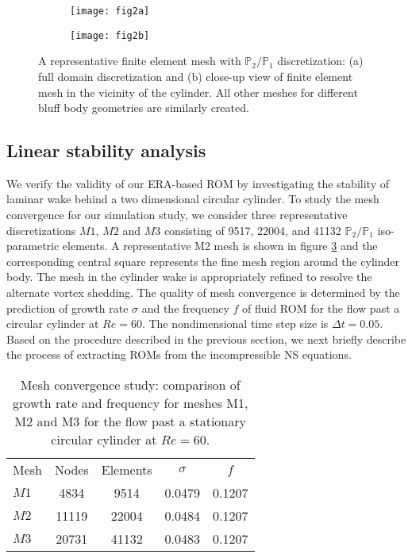 \documentclass{jfm}
\begin{document}
\begin{figure}
\centering
\begin{subfigure}{0.495\textwidth}
    \texttt{[image: fig2a]}
    \caption{}
    \label{fig:mesh_left}
    \end{subfigure} 
\begin{subfigure}{0.495\textwidth} 
\centering
 \texttt{[image: fig2b]}
	\caption{}
	\label{fig:mesh_right}
	\end{subfigure}	
        \caption{A representative finite element mesh with
        $\mathbb{P}_{2}/\mathbb{P}_{1}$ discretization: 
        (a) full domain discretization and
        (b) close-up view of finite element mesh in the vicinity of the cylinder. 
        All other meshes for different bluff body geometries are similarly created. }
	\label{fig:mesh}
\end{figure}

\subsection{Linear stability analysis}\label{sec:linear}
We verify the validity of our ERA-based ROM by investigating 
the stability of laminar wake behind a two dimensional circular cylinder.
%
To study the mesh convergence for our simulation study, we consider 
three representative discretizations $M1$, $M2$ and $M3$ 
consisting of 9517, 22004, and 41132 $\mathbb{P}_{2}/\mathbb{P}_{1}$ 
iso-parametric elements. 
%
A representative M2 mesh is shown in figure \ref{fig:mesh} and 
the corresponding central square represents the fine mesh region around the cylinder body. 
The mesh in the cylinder wake is appropriately refined to resolve 
the alternate vortex shedding. 
%
The quality of mesh convergence is determined by the prediction of
growth rate $\sigma$ and the frequency $f$ of fluid ROM for 
the flow past a circular cylinder at $Re=60$. 
The nondimensional time step size is $\Delta t=0.05$.  
Based on the procedure described in the previous section, we next briefly describe 
the process of extracting ROMs from the incompressible NS equations.

\begin{table}
  \begin{center}
  \begin{tabular}{l c c c c}
       Mesh   & Nodes & Elements &  $\sigma $ &  $f$\\
       $M1$   & 4834 & 9514 & 0.0479 &  0.1207\\
      $M2$   & 11119 & 22004 & 0.0484 &  0.1207\\
      $M3$   & 20731 & 41132 & 0.0483 &  0.1207
  \end{tabular}
  \caption{Mesh convergence study: comparison of growth rate and frequency for meshes M1, M2 and M3 
  for the flow past a stationary circular cylinder at $Re=60$.}
  \label{tab:mesh_conv}
  \end{center}
\end{table}
 
\end{document}
